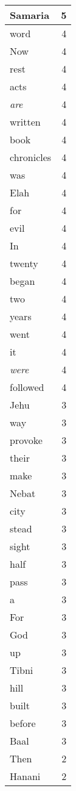 \begin{center}
\begin{longtable}{l|r}
Samaria & 5\\ \hline 
word & 4\\ \hline 
Now & 4\\ \hline 
rest & 4\\ \hline 
acts & 4\\ \hline 
\emph{are} & 4\\ \hline 
written & 4\\ \hline 
book & 4\\ \hline 
chronicles & 4\\ \hline 
was & 4\\ \hline 
Elah & 4\\ \hline 
for & 4\\ \hline 
evil & 4\\ \hline 
In & 4\\ \hline 
twenty & 4\\ \hline 
began & 4\\ \hline 
two & 4\\ \hline 
years & 4\\ \hline 
went & 4\\ \hline 
it & 4\\ \hline 
\emph{were} & 4\\ \hline 
followed & 4\\ \hline 
Jehu & 3\\ \hline 
way & 3\\ \hline 
provoke & 3\\ \hline 
their & 3\\ \hline 
make & 3\\ \hline 
Nebat & 3\\ \hline 
city & 3\\ \hline 
stead & 3\\ \hline 
sight & 3\\ \hline 
half & 3\\ \hline 
pass & 3\\ \hline 
a & 3\\ \hline 
For & 3\\ \hline 
God & 3\\ \hline 
up & 3\\ \hline 
Tibni & 3\\ \hline 
hill & 3\\ \hline 
built & 3\\ \hline 
before & 3\\ \hline 
Baal & 3\\ \hline 
Then & 2\\ \hline 
Hanani & 2\\ \hline 

\end{longtable}
\end{center}
